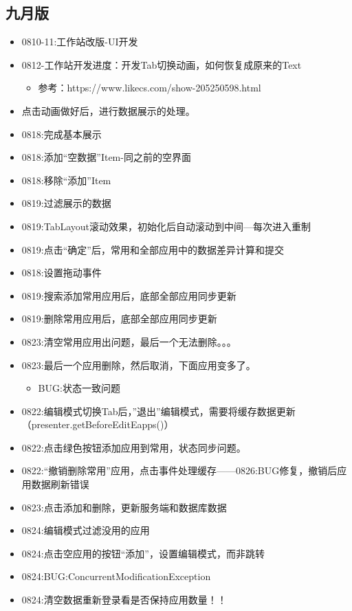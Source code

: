 \documentclass[12pt,a4paper]{ctexart}
\begin{document}
	\subsection{九月版}
	\begin{itemize}
		\item 0810-11:工作站改版-UI开发
		\item 0812-工作站开发进度：开发Tab切换动画，如何恢复成原来的Text
		\begin{itemize}
			\item 参考：https://www.likecs.com/show-205250598.html
		\end{itemize}
		\item 点击动画做好后，进行数据展示的处理。
		\item 0818:完成基本展示
		\item 0818:添加“空数据”Item-同之前的空界面
		\item 0818:移除“添加”Item
		\item 0819:过滤展示的数据
		\item 0819:TabLayout滚动效果，初始化后自动滚动到中间—每次进入重制
		\item 0819:点击“确定”后，常用和全部应用中的数据差异计算和提交
		\item 0818:设置拖动事件
		\item 0819:搜索添加常用应用后，底部全部应用同步更新
		\item 0819:删除常用应用后，底部全部应用同步更新
		\item 0823:清空常用应用出问题，最后一个无法删除。。。
		\item 0823:最后一个应用删除，然后取消，下面应用变多了。
		\begin{itemize}
			\item BUG:状态一致问题
		\end{itemize}
		\item 0822:编辑模式切换Tab后，”退出”编辑模式，需要将缓存数据更新（presenter.getBeforeEditEapps()）
		\item 0822:点击绿色按钮添加应用到常用，状态同步问题。
		\item 0822:“撤销删除常用”应用，点击事件处理缓存——0826:BUG修复，撤销后应用数据刷新错误
		\item 0823:点击添加和删除，更新服务端和数据库数据
		\item 0824:编辑模式过滤没用的应用
		\item 0824:点击空应用的按钮“添加”，设置编辑模式，而非跳转
		\item 0824:BUG:ConcurrentModificationException
		\item 0824:清空数据重新登录看是否保持应用数量！！

\end{itemize}
\end{document}
